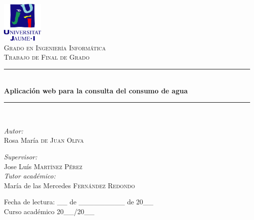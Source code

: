 \documentclass[pdftex,11pt,a4paper]{book}
\newcommand{\HRule}{\rule{\linewidth}{0.5mm}}
\begin{document}
\begin{titlepage}
\begin{center}

\includegraphics[width=0.15\textwidth]{logoUJI.jpg}~\\[2cm]

\textsc{\LARGE Grado en Ingeniería Informática}\\[1.5cm]

\textsc{\LARGE Trabajo de Final de Grado}\\[1.5cm]

\HRule \\[0.4cm]
{ \huge \bfseries Aplicación web para la consulta del consumo de agua \\[0.4cm] }

\HRule \\[1.5cm]

\begin{minipage}{0.4\textwidth}
\begin{flushleft} \large
\emph{Autor:}\\
Rosa María \textsc{de Juan Oliva}
\end{flushleft}
\end{minipage}
\begin{minipage}{0.4\textwidth}
\begin{flushright} \large
\emph{Supervisor:} \\
Jose Luís \textsc{Martínez Pérez} \\
\emph{Tutor académico:} \\
María de las Mercedes \textsc{Fernández Redondo}
\end{flushright}
\end{minipage}

\vfill

{\large Fecha de lectura: \_\_ de \_\_\_\_\_\_\_\_\_ de 20\_\_\\
Curso académico 20\_\_/20\_\_}

\end{center}
\end{titlepage}
\setlength{\parskip}{\baselineskip}
\end{document}
